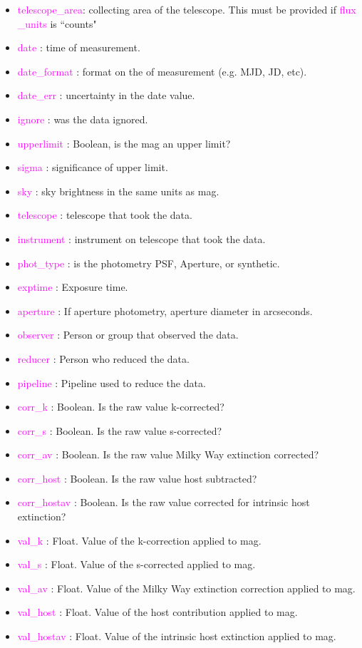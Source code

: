 \documentclass[tighten]{aastex631}
\newcommand{\keyword}[1]{\textcolor{magenta}{#1}}
\begin{document}
\begin{itemize}
    \item \keyword{telescope\_area}: collecting area of the telescope. This must be provided if \keyword{flux
    \_units} is ``counts"
    \item \keyword{date} : time of measurement.
    \item \keyword{date\_format} : format on the of measurement (e.g. MJD, JD, etc).
    \item \keyword{date\_err} : uncertainty in the date value.
    \item \keyword{ignore} : was the data ignored.
    \item \keyword{upperlimit} : Boolean, is the mag an upper limit?
    \item \keyword{sigma} : significance of upper limit.
    \item \keyword{sky} : sky brightness in the same units as mag.
    \item \keyword{telescope} : telescope that took the data.
    \item \keyword{instrument} : instrument on telescope that took the data.
    \item \keyword{phot\_type} : is the photometry PSF, Aperture, or synthetic.
    \item \keyword{exptime} : Exposure time.
    \item \keyword{aperture} : If aperture photometry, aperture diameter in arcseconds.
    \item \keyword{observer} : Person or group that observed the data.
    \item \keyword{reducer} : Person who reduced the data.
    \item \keyword{pipeline} : Pipeline used to reduce the data.
    \item \keyword{corr\_k} : Boolean. Is the raw value k-corrected?
    \item \keyword{corr\_s} : Boolean. Is the raw value s-corrected?
    \item \keyword{corr\_av} : Boolean. Is the raw value Milky Way extinction corrected?
    \item \keyword{corr\_host} : Boolean. Is the raw value host subtracted?
    \item \keyword{corr\_hostav} : Boolean. Is the raw value corrected for intrinsic host extinction?
    \item \keyword{val\_k} : Float. Value of the k-correction applied to mag.
    \item \keyword{val\_s} : Float. Value of the s-corrected applied to mag.
    \item \keyword{val\_av} : Float. Value of the Milky Way extinction correction applied to mag.
    \item \keyword{val\_host} : Float. Value of the host contribution applied to mag.
    \item \keyword{val\_hostav} : Float. Value of the intrinsic host extinction applied to mag.
\end{itemize}
\end{document}
